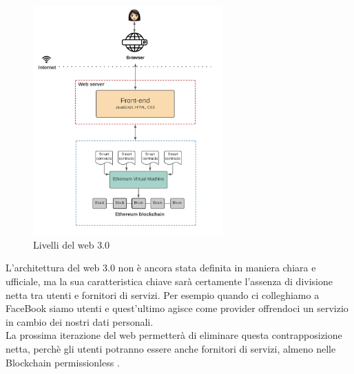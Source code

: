 \begin{figure}[h]
    \caption{Livelli del web 3.0}
    \centering
    \includegraphics[width=0.65\textwidth]{Immagini/web_30.png}
\end{figure}
L'architettura del web 3.0 non è ancora stata definita in maniera chiara e ufficiale, ma la sua caratteristica chiave sarà certamente l'assenza
di divisione netta tra utenti e fornitori di servizi. Per esempio quando ci colleghiamo a FaceBook siamo utenti e quest'ultimo agisce come provider 
offrendoci un servizio in cambio dei nostri dati personali. 
\\La prossima iterazione del web permetterà di eliminare questa contrapposizione netta, perchè
gli utenti potranno essere anche fornitori di servizi, almeno nelle Blockchain permissionless \cite{Blockchain_guida_allecosistema}.
